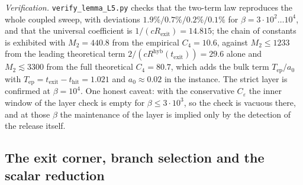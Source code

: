 \documentclass[11pt]{article}
\theoremstyle{definition}
\theoremstyle{remark}
\newcommand{\thit}{t_{\mathrm{hit}}}
\newcommand{\texit}{t_{\mathrm{exit}}}
\newcommand{\Tep}{T_{\mathrm{ep}}}                 %
\newcommand{\hyb}{\mathrm{hyb}}
\begin{document}
\noindent\emph{Verification.} \texttt{verify\_lemma\_L5.py} checks that the
two-term law reproduces the whole coupled sweep, with deviations
$1.9\%/0.7\%/0.2\%/0.1\%$ for $\beta=3\cdot10^2\ldots10^4$, and that the universal
coefficient is $1/(cR_{\mathrm{exit}})=14.815$; the chain of constants is
exhibited with $M_2=440.8$ from the empirical $C_4=10.6$, against
$M_2\le1233$ from the leading theoretical term $2/(cR^{\hyb}(\texit))=29.6$ alone
and $M_2\lesssim3300$ from the full theoretical $C_4=80.7$, which adds the
bulk term $\Tep/a_0$ with $\Tep=\texit-\thit=1.021$ and $a_0\approx0.02$ in the
instance. The strict layer is
confirmed at $\beta=10^4$. One honest caveat: with the conservative
$C_\varepsilon$ the inner window of the layer check is empty for
$\beta\le3\cdot10^3$, so the check is vacuous there, and at those $\beta$ the
maintenance of the layer is implied only by the detection of the release itself.

\subsection{The exit corner, branch selection and the scalar reduction}\label{app:L6}
\end{document}
